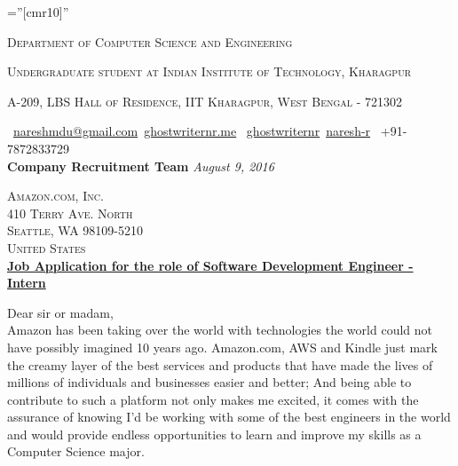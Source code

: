 \documentclass[a4paper,10pt]{extarticle} %
\begin{document}
\pagestyle{empty} %

\font\fb=''[cmr10]'' %


\par{\par} %
\par{\centering\large {\textsc{Department of Computer Science and Engineering}}\par}\large
\par{\centering\large {\textsc{Undergraduate student at Indian Institute of Technology, Kharagpur}}\par}\large
\par{\centering\large {\textsc{A-209, LBS Hall of Residence, IIT Kharagpur, West Bengal - 721302}}\par}\large
\hspace{0.5cm}\normalsize \faEnvelope\ {\href{mailto:nareshmdu@gmail.com}{nareshmdu@gmail.com}}\hfill \normalsize  \faGlobe\ {\href{http://ghostwriternr.me/}{ghostwriternr.me}} \hfill \normalsize \faGithub\ {\href{https://github.com/ghostwriternr}{ghostwriternr}}\hfill \normalsize  \faLinkedinSquare\ {\href{https://www.linkedin.com/in/naresh-r-464a8b8b}{naresh-r}} \hfill {\faPhone\ +91-7872833729} \hspace{0.5cm} \\[10pt]

\textbf{\large{Company Recruitment Team}} \hfill \textit{August 9, 2016}

\textsc{Amazon.com, Inc.} \\
\textsc{410 Terry Ave. North} \\
\textsc{Seattle, WA 98109-5210} \\
\textsc{United States} \\

\underline{\textbf{Job Application for the role of Software Development Engineer - Intern}}

Dear sir or madam,\\

Amazon has been taking over the world with technologies the world could not have possibly imagined 10 years ago. Amazon.com, AWS and Kindle just mark the creamy layer of the best services and products that have made the lives of millions of individuals and businesses easier and better; And being able to contribute to such a platform not only makes me excited, it comes with the assurance of knowing I'd be working with some of the best engineers in the world and would provide endless opportunities to learn and improve my skills as a Computer Science major.\\
\end{document}
